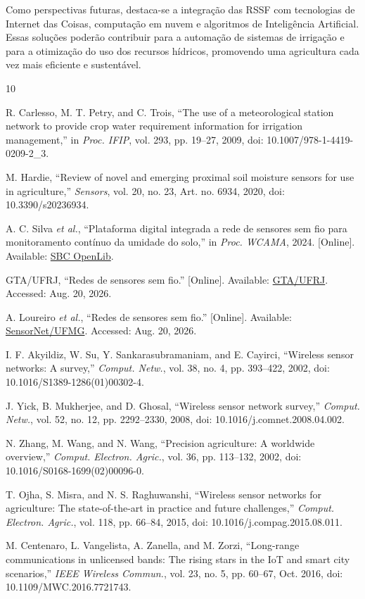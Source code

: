 \documentclass[conference]{IEEEtran}
\begin{document}
Como perspectivas futuras, destaca-se a integração das RSSF com tecnologias de Internet das Coisas, computação em nuvem e algoritmos de Inteligência Artificial. Essas soluções poderão contribuir para a automação de sistemas de irrigação e para a otimização do uso dos recursos hídricos, promovendo uma agricultura cada vez mais eficiente e sustentável.


\begin{thebibliography}{10}

R. Carlesso, M. T. Petry, and C. Trois, ``The use of a meteorological station network to provide crop water requirement information for irrigation management,'' in \emph{Proc. IFIP}, vol. 293, pp. 19--27, 2009, doi: 10.1007/978-1-4419-0209-2\_3.

M. Hardie, ``Review of novel and emerging proximal soil moisture sensors for use in agriculture,'' \emph{Sensors}, vol. 20, no. 23, Art. no. 6934, 2020, doi: 10.3390/s20236934.

A. C. Silva \emph{et al.}, ``Plataforma digital integrada a rede de sensores sem fio para monitoramento contínuo da umidade do solo,'' in \emph{Proc. WCAMA}, 2024. [Online]. Available: \href{https://sol.sbc.org.br/index.php/wcama/article/view/29431}{SBC OpenLib}.

GTA/UFRJ, ``Redes de sensores sem fio.'' [Online]. Available: \href{https://www.gta.ufrj.br/grad/02_2/Redes%20de%20sensores/Redes%20de%20Sensores%20Sem-fio.doc}{GTA/UFRJ}. Accessed: Aug. 20, 2026.

A. Loureiro \emph{et al.}, ``Redes de sensores sem fio.'' [Online]. Available: \href{https://www.sensornet.dcc.ufmg.br/pdf/179_Loureiro_Nogueira_Ruiz_Mini_Nakamura_Figueiredo.pdf}{SensorNet/UFMG}. Accessed: Aug. 20, 2026.

I. F. Akyildiz, W. Su, Y. Sankarasubramaniam, and E. Cayirci, ``Wireless sensor networks: A survey,'' \emph{Comput. Netw.}, vol. 38, no. 4, pp. 393--422, 2002, doi: 10.1016/S1389-1286(01)00302-4.

J. Yick, B. Mukherjee, and D. Ghosal, ``Wireless sensor network survey,'' \emph{Comput. Netw.}, vol. 52, no. 12, pp. 2292--2330, 2008, doi: 10.1016/j.comnet.2008.04.002.

N. Zhang, M. Wang, and N. Wang, ``Precision agriculture: A worldwide overview,'' \emph{Comput. Electron. Agric.}, vol. 36, pp. 113--132, 2002, doi: 10.1016/S0168-1699(02)00096-0.

T. Ojha, S. Misra, and N. S. Raghuwanshi, ``Wireless sensor networks for agriculture: The state-of-the-art in practice and future challenges,'' \emph{Comput. Electron. Agric.}, vol. 118, pp. 66--84, 2015, doi: 10.1016/j.compag.2015.08.011.

M. Centenaro, L. Vangelista, A. Zanella, and M. Zorzi, ``Long-range communications in unlicensed bands: The rising stars in the IoT and smart city scenarios,'' \emph{IEEE Wireless Commun.}, vol. 23, no. 5, pp. 60--67, Oct. 2016, doi: 10.1109/MWC.2016.7721743.

\end{thebibliography}
\end{document}

